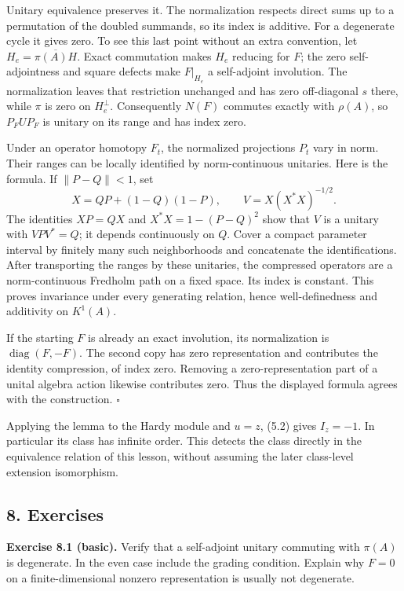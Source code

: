 \documentclass[
  11pt,
]{article}
\begin{document}
Unitary equivalence preserves it. The normalization respects direct sums
up to a permutation of the doubled summands, so its index is additive.
For a degenerate cycle it gives zero. To see this last point without an
extra convention, let \(H_e=\overline{\pi(A)H}\). Exact commutation
makes \(H_e\) reducing for \(F\); the zero self-adjointness and square
defects make \(F|_{H_e}\) a self-adjoint involution. The normalization
leaves that restriction unchanged and has zero off-diagonal \(s\) there,
while \(\pi\) is zero on \(H_e^\perp\). Consequently \(N(F)\) commutes
exactly with \(\rho(A)\), so \(P_FUP_F\) is unitary on its range and has
index zero.

Under an operator homotopy \(F_t\), the normalized projections \(P_t\)
vary in norm. Their ranges can be locally identified by norm-continuous
unitaries. Here is the formula. If \(\|P-Q\|<1\), set \[
X=QP+(1-Q)(1-P),\qquad V=X(X^*X)^{-1/2}.
\] The identities \(XP=QX\) and \(X^*X=1-(P-Q)^2\) show that \(V\) is a
unitary with \(VPV^*=Q\); it depends continuously on \(Q\). Cover a
compact parameter interval by finitely many such neighborhoods and
concatenate the identifications. After transporting the ranges by these
unitaries, the compressed operators are a norm-continuous Fredholm path
on a fixed space. Its index is constant. This proves invariance under
every generating relation, hence well-definedness and additivity on
\(K^1(A)\).

If the starting \(F\) is already an exact involution, its normalization
is \(\operatorname{diag}(F,-F)\). The second copy has zero
representation and contributes the identity compression, of index zero.
Removing a zero-representation part of a unital algebra action likewise
contributes zero. Thus the displayed formula agrees with the
construction. \(\square\)

Applying the lemma to the Hardy module and \(u=z\), (5.2) gives
\(I_z=-1\). In particular its class has infinite order. This detects the
class directly in the equivalence relation of this lesson, without
assuming the later class-level extension isomorphism.

\subsection{8. Exercises}\label{exercises}

\textbf{Exercise 8.1 (basic).} Verify that a self-adjoint unitary
commuting with \(\pi(A)\) is degenerate. In the even case include the
grading condition. Explain why \(F=0\) on a finite-dimensional nonzero
representation is usually not degenerate.
\end{document}
